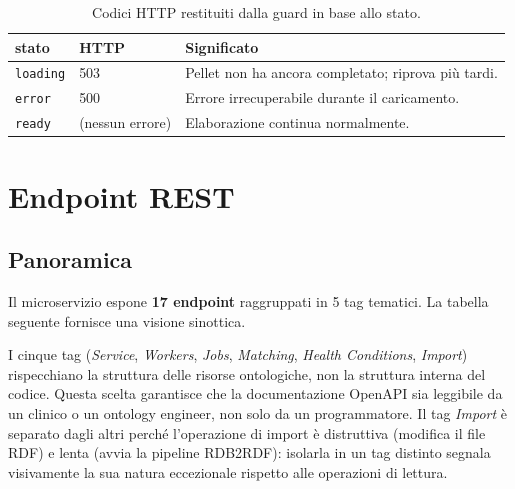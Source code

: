 \documentclass[a4paper,12pt]{article}
\begin{document}
\begin{table}[H]
\centering
\caption{Codici HTTP restituiti dalla guard in base allo stato.}
\begin{tabular}{C{3cm} C{2.5cm} L{6cm}}
\toprule
\textbf{stato} & \textbf{HTTP} & \textbf{Significato} \\
\midrule
\texttt{loading} & 503 & Pellet non ha ancora completato; riprova pi\`{u} tardi. \\
\texttt{error}   & 500 & Errore irrecuperabile durante il caricamento. \\
\texttt{ready}   & (nessun errore) & Elaborazione continua normalmente. \\
\bottomrule
\end{tabular}
\end{table}

\section{Endpoint REST}

\subsection{Panoramica}

Il microservizio espone \textbf{17 endpoint} raggruppati in 5 tag
tematici. La tabella seguente fornisce una visione sinottica.

I cinque tag (\textit{Service}, \textit{Workers}, \textit{Jobs},
\textit{Matching}, \textit{Health Conditions}, \textit{Import}) rispecchiano
la struttura delle risorse ontologiche, non la struttura interna del codice.
Questa scelta garantisce che la documentazione OpenAPI sia leggibile da un
clinico o un ontology engineer, non solo da un programmatore. Il tag
\textit{Import} \`{e} separato dagli altri perch\'{e} l'operazione di import
\`{e} distruttiva (modifica il file RDF) e lenta (avvia la pipeline RDB2RDF):
isolarla in un tag distinto segnala visivamente la sua natura eccezionale
rispetto alle operazioni di lettura.
\end{document}
